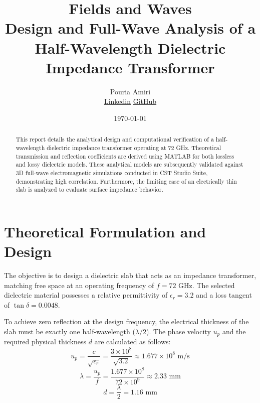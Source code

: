 \documentclass[12pt, a4paper]{article}
\title{\textbf{Fields and Waves}\\ \Large Design and Full-Wave Analysis of a Half-Wavelength Dielectric Impedance Transformer}
\author{Pouria Amiri \\ \href{https://www.linkedin.com/in/pouria-amiri-9843a333a/}{Linkedin}
	\href{https://github.com/amiripouria}{GitHub}}
\date{\today}
\begin{document}
\maketitle

\begin{abstract}
	This report details the analytical design and computational verification of a half-wavelength dielectric impedance transformer operating at 72 GHz. Theoretical transmission and reflection coefficients are derived using MATLAB for both lossless and lossy dielectric models. These analytical models are subsequently validated against 3D full-wave electromagnetic simulations conducted in CST Studio Suite, demonstrating high correlation. Furthermore, the limiting case of an electrically thin slab is analyzed to evaluate surface impedance behavior.
\end{abstract}

\section{Theoretical Formulation and Design}
The objective is to design a dielectric slab that acts as an impedance transformer, matching free space at an operating frequency of $f = 72\text{ GHz}$. The selected dielectric material possesses a relative permittivity of $\epsilon_r = 3.2$ and a loss tangent of $\tan \delta = 0.0048$.

To achieve zero reflection at the design frequency, the electrical thickness of the slab must be exactly one half-wavelength ($\lambda/2$). The phase velocity $u_p$ and the required physical thickness $d$ are calculated as follows:
\begin{equation}
	u_p = \frac{c}{\sqrt{\epsilon_r}} = \frac{3 \times 10^8}{\sqrt{3.2}} \approx 1.677 \times 10^8 \text{ m/s}
\end{equation}
\begin{equation}
	\lambda = \frac{u_p}{f} = \frac{1.677 \times 10^8}{72 \times 10^9} \approx 2.33 \text{ mm}
\end{equation}
\begin{equation}
	d = \frac{\lambda}{2} = 1.16 \text{ mm}
\end{equation}
\end{document}
